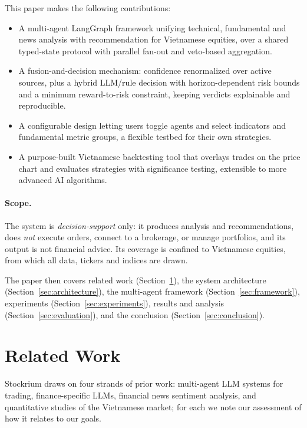 \documentclass[runningheads]{llncs}
\begin{document}
This paper makes the following contributions:
\begin{itemize}
\item A multi-agent LangGraph framework unifying technical, fundamental and news
analysis with recommendation for Vietnamese equities, over a shared typed-state
protocol with parallel fan-out and veto-based aggregation.
\item A fusion-and-decision mechanism: confidence renormalized over active sources,
plus a hybrid LLM/rule decision with horizon-dependent risk bounds and a minimum
reward-to-risk constraint, keeping verdicts explainable and reproducible.
\item A configurable design letting users toggle agents and select indicators and
fundamental metric groups, a flexible testbed for their own strategies.
\item A purpose-built Vietnamese backtesting tool that overlays trades on the price
chart and evaluates strategies with significance testing, extensible to more
advanced AI algorithms.
\end{itemize}

\paragraph{Scope.}
The system is \emph{decision-support} only: it produces analysis and
recommendations, does \emph{not} execute orders, connect to a brokerage, or manage
portfolios, and its output is not financial advice. Its coverage is confined to
Vietnamese equities, from which all data, tickers and indices are drawn.

The paper then covers related work (Section~\ref{sec:related}), the system
architecture (Section~\ref{sec:architecture}), the multi-agent framework
(Section~\ref{sec:framework}), experiments (Section~\ref{sec:experiments}),
results and analysis (Section~\ref{sec:evaluation}), and the conclusion
(Section~\ref{sec:conclusion}).

\section{Related Work}
\label{sec:related}

Stockrium draws on four strands of prior work: multi-agent LLM systems for
trading, finance-specific LLMs, financial news sentiment analysis, and
quantitative studies of the Vietnamese market; for each we note our assessment of
how it relates to our goals.
\end{document}
